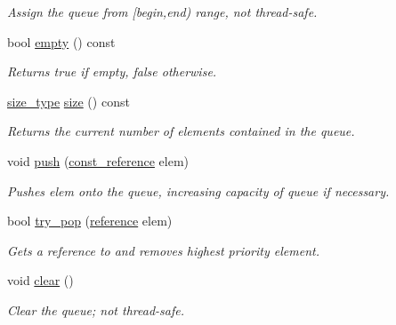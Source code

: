\begin{DoxyCompactItemize}
\begin{DoxyCompactList}\small\item\em Assign the queue from \mbox{[}begin,end) range, not thread-\/safe. \end{DoxyCompactList}\item 
bool \hyperlink{classtbb_1_1interface5_1_1concurrent__priority__queue_a8dec2dd0e8b22af14f1753eaef1bf5eb}{empty} () const 
\begin{DoxyCompactList}\small\item\em Returns true if empty, false otherwise. \end{DoxyCompactList}\item 
\hyperlink{classtbb_1_1interface5_1_1concurrent__priority__queue_a7d3da9b47ec58e1c09e3550f702edcfc}{size\+\_\+type} \hyperlink{classtbb_1_1interface5_1_1concurrent__priority__queue_a7d86ba200474b51ec99a6b917429c6bb}{size} () const 
\begin{DoxyCompactList}\small\item\em Returns the current number of elements contained in the queue. \end{DoxyCompactList}\item 
void \hyperlink{classtbb_1_1interface5_1_1concurrent__priority__queue_a1bfa0e7269b3407d6bb5c706264d2406}{push} (\hyperlink{classtbb_1_1interface5_1_1concurrent__priority__queue_a0bd617fe8e4657777e86f0ae15d8094f}{const\+\_\+reference} elem)
\begin{DoxyCompactList}\small\item\em Pushes elem onto the queue, increasing capacity of queue if necessary. \end{DoxyCompactList}\item 
bool \hyperlink{classtbb_1_1interface5_1_1concurrent__priority__queue_a954177b09e184cf3db47f1b180a7ef5e}{try\+\_\+pop} (\hyperlink{classtbb_1_1interface5_1_1concurrent__priority__queue_ae4b7ed2ddc8ec6cc910f935c9d299c7a}{reference} elem)
\begin{DoxyCompactList}\small\item\em Gets a reference to and removes highest priority element. \end{DoxyCompactList}\item 
void \hyperlink{classtbb_1_1interface5_1_1concurrent__priority__queue_a2459166998a4103880d603b237c429e6}{clear} ()
\begin{DoxyCompactList}\small\item\em Clear the queue; not thread-\/safe. \end{DoxyCompactList}\item 

\end{DoxyCompactItemize}

